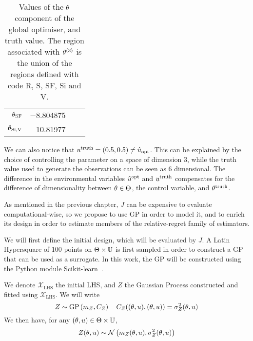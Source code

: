 \documentclass[../../Main_ManuscritThese.tex]{subfiles}
\begin{document}
\begin{table}[!h]
\begin{tabular}{rrrr}
    $\theta_{\mathrm{SF}}$   & \num[round-mode=places,round-precision=4]{-8.804875}                                                                                                                                                                                                                                        &                          &                                                                         \\
    $\theta_{\mathrm{Si,V}}$ & \num[round-mode=places,round-precision=4]{-10.81977}                                                                                                                                                                                                                                        &                          &                                                                         \\ \bottomrule
  \end{tabular}
  \caption[Values of the $\kk$ component of the global optimiser, and
  truth value]{\label{tab:ktruthkopt} Values of the $\kk$ component of
    the global optimiser, and truth value. The region associated with
    $\theta^{(3)}$ is the union of the regions defined with code R, S,
    SF, Si and V.}
\end{table}
We can also notice that
$u^{\mathrm{truth}}=(\num{0.5},\num{0.5}) \neq
\hat{u}_{\mathrm{opt}}$. This can be explained by the choice of
controlling the parameter on a space of dimension 3, while the truth
value used to generate the observations can be seen as 6
dimensional. The difference in the environmental variables $\hat{u}^{\mathrm{opt}}$ and
$u^{\mathrm{truth}}$ compensates for the
difference of dimensionality between $\theta\in\Theta$, the control
variable, and $\theta^{\mathrm{truth}}$.

As mentioned in the previous chapter, $J$ can be expensive to evaluate
computational-wise, so we propose to use GP in order to model it, and
to enrich its design in order to estimate members of the
relative-regret family of estimators.

We will first define the initial design, which will be evaluated by
$J$. A Latin Hypersquare of \num{100} points on
$\Theta \times \mathbb{U}$ is first sampled in order to construct a GP
that can be used as a surrogate.  In this work, the GP will be
constructed using the Python module
Scikit-learn~\citep{pedregosa_scikit-learn_2011}.

We denote $\mathcal{X}_{\mathrm{LHS}}$ the initial LHS, and $Z$ the
Gaussian Process constructed and fitted using
$\mathcal{X}_{\mathrm{LHS}}$.  We will write
\begin{equation}
  Z \sim \operatorname{\mathrm{GP}}\left(m_Z, C_Z\right) \quad C_Z((\theta, u),(\theta, u)) = \sigma^2_Z(\theta, u)
\end{equation}
We then have, for any $(\theta, u) \in \Theta\times\mathbb{U}$,
\begin{equation}
  Z(\theta, u) \sim \mathcal{N}\left(m_Z(\theta, u), \sigma^2_Z(\theta, u)\right)
\end{equation}
\end{document}
